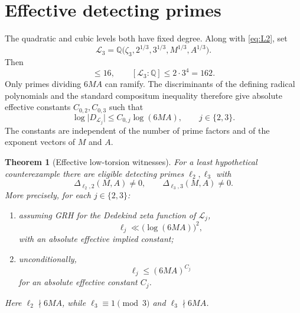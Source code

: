 \documentclass[11pt]{article}
\numberwithin{equation}{section}
\newtheorem{theorem}{Theorem}[section]
\theoremstyle{definition}
\theoremstyle{remark}
\newcommand{\Q}{\mathbb Q}
\newcommand{\abs}[1]{\lvert#1\rvert}
\begin{document}
\section{Effective detecting primes}
\label{sec:effective}

The quadratic and cubic levels both have fixed degree.  Along with \eqref{eq:L2}, set
\begin{equation}
 \mathcal L_3=\Q\bigl(\zeta_3,2^{1/3},3^{1/3},M^{1/3},A^{1/3}\bigr).
 \label{eq:L3}
\end{equation}
Then
\begin{equation}
 [\mathcal L_2:\Q]\le16,
 \qquad
 [\mathcal L_3:\Q]\le 2\cdot3^4=162.
 \label{eq:degrees}
\end{equation}
Only primes dividing \(6MA\) can ramify.  The discriminants of the defining radical
polynomials and the standard compositum inequality \cite{MilneANT,Neukirch} therefore give
absolute effective constants \(C_{0,2},C_{0,3}\) such that
\begin{equation}
 \log\abs{D_{\mathcal L_j}}\le C_{0,j}\log(6MA),
 \qquad j\in\{2,3\}.
 \label{eq:discbounds}
\end{equation}
The constants are independent of the number of prime factors and of the exponent vectors of
\(M\) and \(A\).

\begin{theorem}[Effective low-torsion witnesses]
\label{thm:effectivewitness}
For a least hypothetical counterexample there are eligible detecting primes
\(\ell_2,\ell_3\) with
\[
 \Delta_{\ell_2,2}(M,A)\ne0,
 \qquad
 \Delta_{\ell_3,3}(M,A)\ne0.
\]
More precisely, for each \(j\in\{2,3\}\):
\begin{enumerate}
\item assuming GRH for the Dedekind zeta function of \(\mathcal L_j\),
\begin{equation}
 \ell_j\ll \bigl(\log(6MA)\bigr)^2,
 \label{eq:GRHbound}
\end{equation}
with an absolute effective implied constant;
\item unconditionally,
\begin{equation}
 \ell_j\le(6MA)^{C_j}
 \label{eq:uncondbound}
\end{equation}
for an absolute effective constant \(C_j\).
\end{enumerate}
Here \(\ell_2\nmid6MA\), while \(\ell_3\equiv1\pmod3\) and \(\ell_3\nmid6MA\).
\end{theorem}
\end{document}

